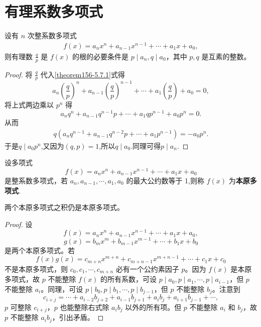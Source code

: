 \documentclass[../../main.tex]{subfiles}
\begin{document}
\section{有理系数多项式}

\begin{theorem}[整数系数多项式有有理根的必要条件]\label{theorem:整数系数多项式有有理根的必要条件}
设有 \( n \) 次整系数多项式
\begin{align}
f(x) = a_n x^n + a_{n-1} x^{n-1} + \cdots + a_1 x + a_0, \label{theorem156-5.7.1}
\end{align}
则有理数 \( \frac{q}{p} \) 是 \( f(x) \) 的根的必要条件是 \( p \mid a_n, q \mid a_0 \)，其中 \( p, q \) 是互素的整数。
\end{theorem}
\begin{proof}
将 \( \frac{q}{p} \) 代入\eqref{theorem156-5.7.1}式得
\[
a_n \left( \frac{q}{p} \right)^n + a_{n-1} \left( \frac{q}{p} \right)^{n-1} + \cdots + a_1 \left( \frac{q}{p} \right) + a_0 = 0,
\]
将上式两边乘以 \( p^n \) 得
\[
a_n q^n + a_{n-1} q^{n-1} p + \cdots + a_1 q p^{n-1} + a_0 p^n = 0.
\]
从而
\begin{align*}
q\left( a_nq^{n-1}+a_{n-1}q^{n-2}p+\cdots +a_1p^{n-1} \right) =-a_0p^n.
\end{align*}
于是$q\mid a_0p^n$,又因为$(q,p)=1$,所以$q\mid a_0$.同理可得$p \mid a_n$.

\end{proof}

\begin{definition}[本原多项式]
设多项式
\[
f(x) = a_n x^n + a_{n-1} x^{n-1} + \cdots + a_1 x + a_0
\]
是整系数多项式，若 \( a_n, a_{n-1}, \cdots, a_1, a_0 \) 的最大公约数等于 1,则称 \( f(x) \) 为\textbf{本原多项式}.
\end{definition}

\begin{lemma}[Gauss引理]\label{lemma:Gauss引理}
两个本原多项式之积仍是本原多项式。
\end{lemma}
\begin{proof}
设
\[
f(x) = a_n x^n + a_{n-1} x^{n-1} + \cdots + a_1 x + a_0,
\]
\[
g(x) = b_m x^m + b_{m-1} x^{m-1} + \cdots + b_1 x + b_0
\]
是两个本原多项式。若
\[
f(x) g(x) = c_{m+n} x^{m+n} + c_{m+n-1} x^{m+n-1} + \cdots + c_1 x + c_0
\]
不是本原多项式，则 \( c_0, c_1, \cdots, c_{m+n} \) 必有一个公约素因子 \( p \)。因为 \( f(x) \) 是本原多项式，故 \( p \) 不能整除 \( f(x) \) 的所有系数，可设 \( p \mid a_0, p \mid a_1, \cdots, p \mid a_{i-1} \)，但 \( p \) 不能整除 \( a_i \)。同理，可设 \( p \mid b_0, p \mid b_1, \cdots, p \mid b_{j-1} \)，但 \( p \) 不能整除 \( b_j \)。注意到
\[
c_{i+j} = \cdots + a_{i-2} b_{j+2} + a_{i-1} b_{j+1} + a_i b_j + a_{i+1} b_{j-1} + \cdots,
\]
\( p \) 可整除 \( c_{i+j} \)，\( p \) 也能整除右式除 \( a_i b_j \) 以外的所有项。但 \( p \) 不能整除 \( a_i \) 和 \( b_j \)，故 \( p \) 不能整除 \( a_i b_j \)，引出矛盾。

\end{proof}
\end{document}
